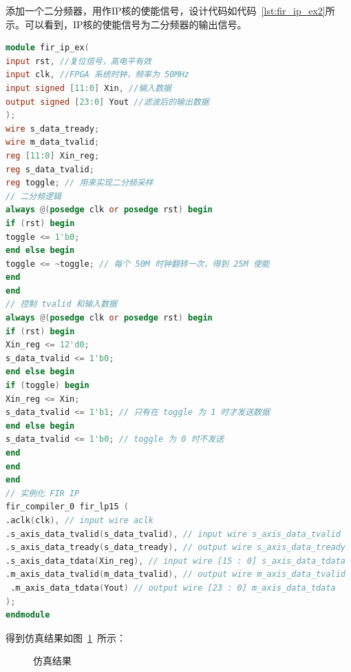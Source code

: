 添加一个二分频器，用作IP核的使能信号，设计代码如代码~\ref{lst:fir_ip_ex2}所示。可以看到，IP核的使能信号为二分频器的输出信号。
\begin{lstlisting}[language=verilog,caption={基于IP核的半串行结构的FIR滤波器},label=lst:fir_ip_ex2]
module fir_ip_ex(
input rst, //复位信号，高电平有效
input clk, //FPGA 系统时钟，频率为 50MHz
input signed [11:0] Xin, //输入数据
output signed [23:0] Yout //滤波后的输出数据
);
wire s_data_tready;
wire m_data_tvalid;
reg [11:0] Xin_reg;
reg s_data_tvalid;
reg toggle; // 用来实现二分频采样
// 二分频逻辑
always @(posedge clk or posedge rst) begin
if (rst) begin
toggle <= 1'b0;
end else begin
toggle <= ~toggle; // 每个 50M 时钟翻转一次，得到 25M 使能
end
end
// 控制 tvalid 和输入数据
always @(posedge clk or posedge rst) begin
if (rst) begin
Xin_reg <= 12'd0;
s_data_tvalid <= 1'b0;
end else begin
if (toggle) begin
Xin_reg <= Xin;
s_data_tvalid <= 1'b1; // 只有在 toggle 为 1 时才发送数据
end else begin
s_data_tvalid <= 1'b0; // toggle 为 0 时不发送
end
end
end
// 实例化 FIR IP
fir_compiler_0 fir_lp15 (
.aclk(clk), // input wire aclk
.s_axis_data_tvalid(s_data_tvalid), // input wire s_axis_data_tvalid
.s_axis_data_tready(s_data_tready), // output wire s_axis_data_tready
.s_axis_data_tdata(Xin_reg), // input wire [15 : 0] s_axis_data_tdata
.m_axis_data_tvalid(m_data_tvalid), // output wire m_axis_data_tvalid
 .m_axis_data_tdata(Yout) // output wire [23 : 0] m_axis_data_tdata
);
endmodule
\end{lstlisting}

得到仿真结果如图~\ref{fig:exp7:sim_result2}~所示：
\begin{figure}[htbp]
    \centering
    \hfill
    \caption{仿真结果} 
    \label{fig:exp7:sim_result2}
\end{figure}